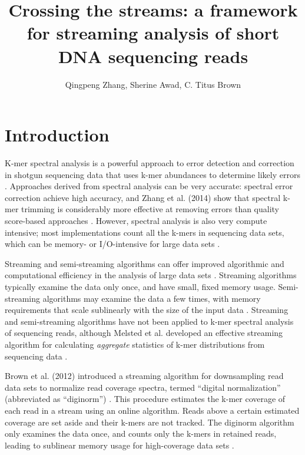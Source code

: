 \documentclass{article}
\begin{document}
\title{Crossing the streams: a framework for streaming analysis of
short DNA sequencing reads}

\author{Qingpeng Zhang, Sherine Awad, C. Titus Brown}
\maketitle

\section{Introduction}

K-mer spectral analysis is a powerful approach to error detection and
correction in shotgun sequencing data that uses k-mer abundances to
determine likely errors \cite{Pevzner2001}.  Approaches derived from
spectral analysis can be very accurate: spectral error correction
achieve high accuracy, and Zhang et al. (2014) show that spectral
k-mer trimming is considerably more effective at removing errors than
quality score-based approaches \cite{correctors,Zhang2014}.  However,
spectral analysis is also very compute intensive; most implementations
count all the k-mers in sequencing data sets, which can be memory- or
I/O-intensive for large data sets \cite{Zhang2014}.

Streaming and semi-streaming algorithms can offer improved algorithmic
and computational efficiency in the analysis of large data sets
\cite{Charikar2004, Cormode2005}.  Streaming algorithms typically
examine the data only once, and have small, fixed memory usage.
Semi-streaming algorithms may examine the data a few times, with
memory requirements that scale sublinearly with the size of the input
data \cite{Feigenbaum2005}.  Streaming and semi-streaming algorithms
have not been applied to k-mer spectral analysis of sequencing reads,
although Melsted et al. developed an effective streaming algorithm for
calculating {\em aggregate} statistics of k-mer distributions from
sequencing data \cite{Melsted2014}.

Brown et al. (2012) introduced a streaming algorithm for downsampling
read data sets to normalize read coverage spectra, termed ``digital
normalization'' (abbreviated as ``diginorm'') \cite{Brown2012}.  This
procedure estimates the k-mer coverage of each read in a stream using
an online algorithm. Reads above a certain estimated coverage are set
aside and their k-mers are not tracked.  The diginorm algorithm only
examines the data once, and counts only the k-mers in retained reads,
leading to sublinear memory usage for high-coverage data sets
\cite{Brown2012}.
\end{document}
